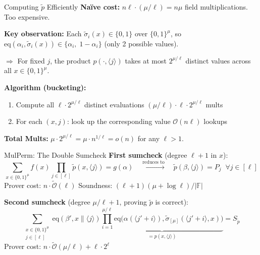\documentclass[aspectratio=169,10pt]{beamer}
\newcommand{\F}{\mathbb{F}}
\newcommand{\B}{\{0,1\}}
\newcommand{\eq}{\mathrm{eq}}
\newcommand{\wt}[1]{\widetilde{#1}}
\newcommand{\bigO}{\mathcal{O}}
\begin{document}
\begin{frame}{Computing $\wt{p}$ Efficiently}
\textbf{Na\"ive cost:} $n\ell \cdot (\mu/\ell) = n\mu$ field multiplications. Too expensive.

\vspace{0.6em}
\textbf{Key observation:} Each $\wt{\sigma}_i(x) \in \{0, 1\}$ over $\B^\mu$, so $\eq(\alpha_i, \wt{\sigma}_i(x)) \in \{\alpha_i,\; 1-\alpha_i\}$ (only 2 possible values).

$\Rightarrow$ For fixed $j$, the product $p(\cdot, \langle j \rangle)$ takes at most $2^{\mu/\ell}$ distinct values across all $x \in \B^\mu$.

\vspace{0.6em}
\textbf{Algorithm (bucketing):}
\begin{enumerate}
  \item Compute all $\ell \cdot 2^{\mu/\ell}$ distinct evaluations \hfill $(\mu/\ell) \cdot \ell \cdot 2^{\mu/\ell}$ mults
  \item For each $(x, j)$: look up the corresponding value \hfill $\bigO(n\ell)$ lookups
\end{enumerate}

\vspace{0.3em}
\textbf{Total Mults:} $\mu \cdot 2^{\mu/\ell} = \mu \cdot n^{1/\ell} = o(n)$ for any $\ell > 1$.
\end{frame}

\begin{frame}{MulPerm: The Double Sumcheck}
\textbf{First sumcheck} (degree $\ell + 1$ in $x$):
\[
  \sum_{x \in \B^\mu} f(x) \prod_{j \in [\ell]} \wt{p}(x, \langle j \rangle) = g(\alpha)
  \quad \xrightarrow{\text{reduces to}} \quad
  \wt{p}(\beta, \langle j \rangle) = P_j \;\;\forall j \in [\ell]
\]
Prover cost: $n \cdot \widetilde{\bigO}(\ell)$ \quad Soundness: $(\ell+1)(\mu + \log\ell) / |\F|$

\vspace{0.8em}
\textbf{Second sumcheck} (degree $\mu/\ell + 1$, proving $\wt{p}$ is correct):
\[
  \sum_{\substack{x \in \B^\mu \\ j \in [\ell]}} \eq(\beta', x \| \langle j \rangle) \underbrace{\prod_{i=1}^{\mu/\ell} \eq\!\bigl(\alpha(\langle j'+i \rangle), \wt{\sigma}_{[\mu]}(\langle j'+i \rangle, x)\bigr)}_{= p(x, \langle j \rangle)} = S_{\wt{p}}
\]
Prover cost: $n \cdot \widetilde{\bigO}(\mu/\ell) + \ell \cdot 2^\ell$
\end{frame}
\end{document}
